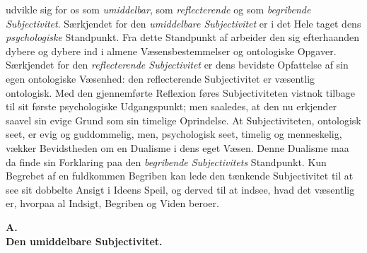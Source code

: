 \documentclass[12pt]{book}
\newcommand{\opage}[1]{\marginnote{\footnotesize\textit{[#1]}}}
\begin{document}
udvikle sig for os som \emph{umiddelbar}, som \emph{reflecterende} og som
\emph{begribende Subjectivitet}. Særkjendet for den \emph{umiddelbare Subjectivitet}
er i det Hele taget dens \emph{psychologiske} Standpunkt. Fra dette Standpunkt af
arbeider den sig efterhaanden dybere og dybere ind i almene Væsensbestemmelser og
ontologiske Opgaver. Særkjendet for den \emph{reflecterende Subjectivitet} er dens
bevidste Opfattelse af sin egen ontologiske Væsenhed: den reflecterende Subjectivitet
er væsentlig ontologisk. Med den gjennemførte Reflexion føres Subjectiviteten vistnok
tilbage til sit første psychologiske Udgangspunkt; men saaledes, at den nu erkjender
saavel sin evige Grund som sin timelige Oprindelse. At Subjectiviteten, ontologisk
seet, er evig og guddommelig, men, psychologisk seet, timelig og menneskelig, vækker
Bevidstheden om en Dualisme i dens eget Væsen. Denne Dualisme maa da finde sin
Forklaring paa den \emph{begribende Subjectivitets} Standpunkt. Kun Begrebet af en
fuldkommen Begriben kan lede den tænkende Subjectivitet til at see sit dobbelte
Ansigt i Ideens Speil, og derved til at indsee, hvad det væsentlig er, hvorpaa al
Indsigt, Begriben og Viden beroer.
\opage{12} \begin{center}
{\bfseries A.}\\[2pt]
{\large\bfseries Den umiddelbare Subjectivitet.}
\end{center}
\end{document}
